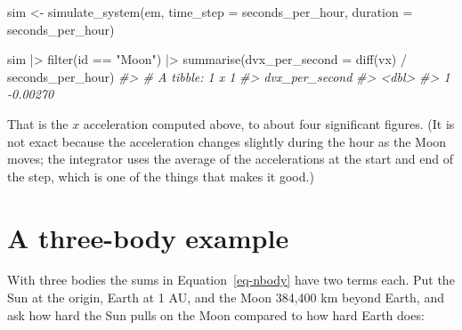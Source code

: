\documentclass[
  10.5pt,
  letterpaper,
]{scrbook}
\newenvironment{Shaded}{\begin{snugshade}}{\end{snugshade}}
\newcommand{\AttributeTok}[1]{\textcolor[rgb]{0.00,0.00,0.00}{#1}}
\newcommand{\CommentTok}[1]{\textcolor[rgb]{0.00,0.00,0.00}{\textit{#1}}}
\newcommand{\FunctionTok}[1]{\textcolor[rgb]{0.00,0.00,0.00}{#1}}
\newcommand{\NormalTok}[1]{\textcolor[rgb]{0.00,0.00,0.00}{#1}}
\newcommand{\OtherTok}[1]{\textcolor[rgb]{0.00,0.00,0.00}{#1}}
\newcommand{\SpecialCharTok}[1]{\textcolor[rgb]{0.00,0.00,0.00}{#1}}
\newcommand{\StringTok}[1]{\textcolor[rgb]{0.00,0.00,0.00}{#1}}
\theoremstyle{plain}
\theoremstyle{remark}
\begin{document}
\begin{Shaded}
\begin{Highlighting}[]
\NormalTok{sim }\OtherTok{\textless{}{-}} \FunctionTok{simulate\_system}\NormalTok{(em, }\AttributeTok{time\_step =}\NormalTok{ seconds\_per\_hour,}
                       \AttributeTok{duration =}\NormalTok{ seconds\_per\_hour)}

\NormalTok{sim }\SpecialCharTok{|\textgreater{}}
  \FunctionTok{filter}\NormalTok{(id }\SpecialCharTok{==} \StringTok{"Moon"}\NormalTok{) }\SpecialCharTok{|\textgreater{}}
  \FunctionTok{summarise}\NormalTok{(}\AttributeTok{dvx\_per\_second =} \FunctionTok{diff}\NormalTok{(vx) }\SpecialCharTok{/}\NormalTok{ seconds\_per\_hour)}
\CommentTok{\#\textgreater{} \# A tibble: 1 x 1}
\CommentTok{\#\textgreater{}   dvx\_per\_second}
\CommentTok{\#\textgreater{}            \textless{}dbl\textgreater{}}
\CommentTok{\#\textgreater{} 1       {-}0.00270}
\end{Highlighting}
\end{Shaded}

That is the \(x\) acceleration computed above, to about four significant
figures. (It is not exact because the acceleration changes slightly
during the hour as the Moon moves; the integrator uses the average of
the accelerations at the start and end of the step, which is one of the
things that makes it good.)

\section{A three-body example}\label{a-three-body-example}

With three bodies the sums in Equation~\ref{eq-nbody} have two terms
each. Put the Sun at the origin, Earth at 1 AU, and the Moon 384,400 km
beyond Earth, and ask how hard the Sun pulls on the Moon compared to how
hard Earth does:
\end{document}
